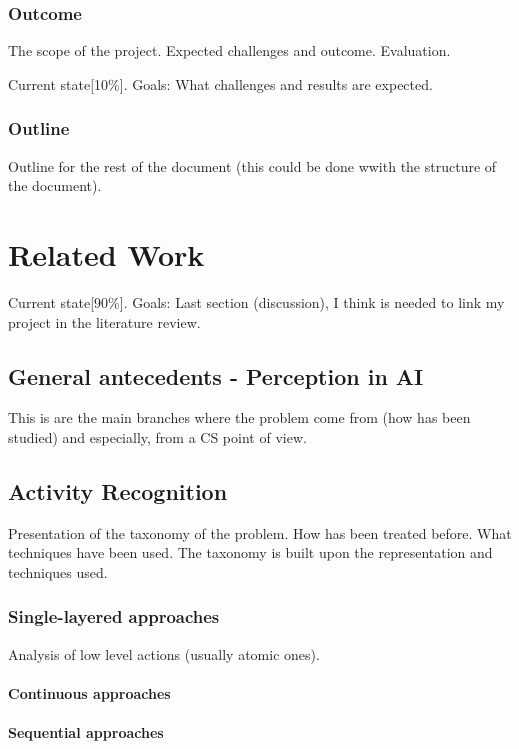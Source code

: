 \documentclass[a4paper, 12pt, openany, oneside]{book}
\begin{document}
\subsection{Outcome}
The scope of the project.
Expected challenges and outcome.
Evaluation.


Current state[10\%].
Goals: What challenges and results are expected.


\subsection{Outline}
Outline for the rest of the document (this could be done wwith the structure of the document).


\chapter{Related Work}

Current state[90\%].
Goals: Last section (discussion), I think is needed to link my project in the literature review.


\section{General antecedents - Perception in AI}
This is are the main branches where the problem come from (how has been studied) and especially, from a CS point of view.

\section{Activity Recognition} 
Presentation of the taxonomy of the problem. 
How has been treated before.
What techniques have been used.
The taxonomy is built upon the representation and techniques used.

\subsection{Single-layered approaches}
Analysis of low level actions (usually atomic ones).
\subsubsection{Continuous approaches} %
\subsubsection{Sequential approaches} %
\end{document}
